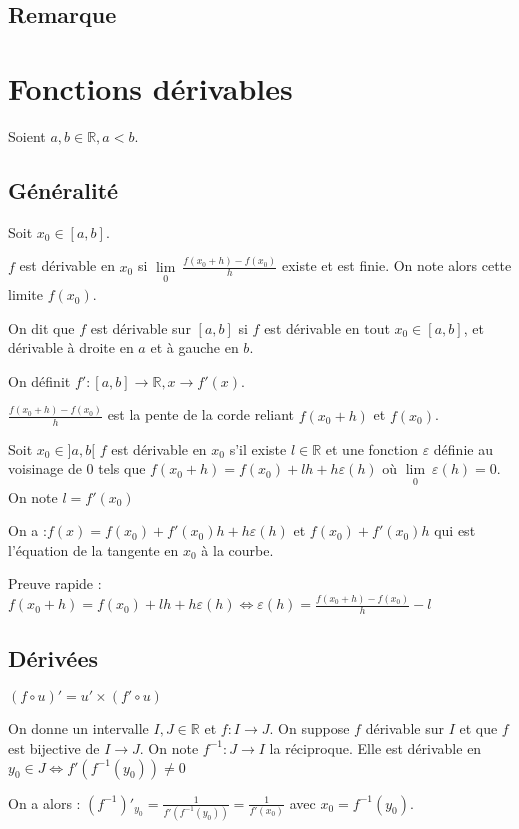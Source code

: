 \documentclass[french]{yLectureNote}
\newcommand{\Lim}[1]{\lim\limits_{\substack{#1}}\:}
\begin{document}
\subsection{Remarque}
\section{Fonctions dérivables}
Soient $a,b \in\mathbb{R}, a<b$.
\subsection{Généralité}
\begin{theorem}[Définition 1]
Soit $x_0 \in[a,b]$.

$f$ est dérivable en $x_0$ si $\Lim{0} \frac{f(x_0+h)-f(x_0)}{h}$ existe et est finie. On note alors cette limite $f(x_0)$.

On dit que $f$ est dérivable sur $[a,b]$ si $f$ est dérivable en tout $x_0 \in[a,b]$, et dérivable à droite en $a$ et à gauche en $b$.

On définit $f' : [a,b]\to\mathbb{R}, x\to f'(x)$.
\end{theorem}
$\frac{f(x_0+h)-f(x_0)}{h}$ est la pente de la corde reliant $f(x_0+h)$ et $f(x_0)$.
\begin{theorem}
Soit $x_0 \in]a,b[$ $f$ est dérivable en $x_0$ s'il existe $l\in\mathbb{R}$ et une fonction $\varepsilon$ définie au voisinage de 0 tels que $f(x_0+h) = f(x_0) + lh+h\varepsilon(h)$ où $\Lim{0} \varepsilon(h)=0$. On note $l=f'(x_0)$

On a :$f(x) = f(x_0) + f'(x_0)h+h\varepsilon(h)$ et $f(x_0) + f'(x_0)h$ qui est l'équation de la tangente en $x_0$ à la courbe.
\end{theorem}
Preuve rapide :  $f(x_0+h) = f(x_0) + lh+h\varepsilon(h) \iff \varepsilon(h) = \frac{f(x_0+h)-f(x_0)}{h} -l$
\subsection{Dérivées}
$(f\circ u)' = u'\times(f'\circ u)$

\begin{theorem}
On donne un intervalle $I,J\in\mathbb{R}$ et $f:I\to J$. On suppose $f$ dérivable sur $I$ et que $f$ est bijective de $I\to J$. On note $f^{-1} :J\to I$ la réciproque. Elle est dérivable en $y_0\in J \iff f'(f^{-1}(y_0))\neq 0$

On a alors : $(f^{-1})'_{y_0} = \frac{1}{f'(f^{-1}(y_0))} = \frac{1}{f'(x_0)}$ avec $x_0 = f^{-1}(y_0)$.
\end{theorem}
\end{document}
